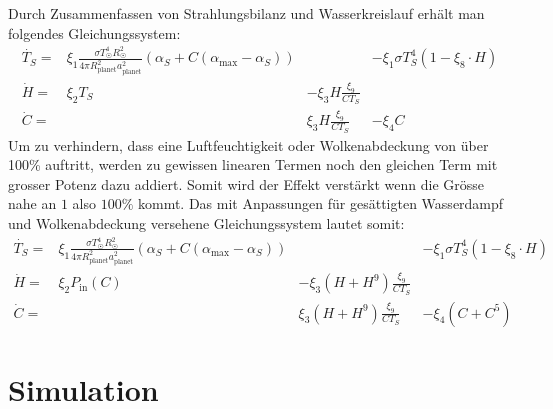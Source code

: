 \begin{refsection}
Durch Zusammenfassen von Strahlungsbilanz und Wasserkreislauf erhält man folgendes Gleichungssystem:
\begin{equation}
\begin{matrix}
\dot{T_S} = & \xi_1 \frac{\sigma T_{\astrosun}^4 R_{\astrosun}^2}{4 \pi R_{\text{planet}}^2 a_{\text{planet}}^2} (\alpha_S + C(\alpha_{\text{max}} - \alpha_S)) && - \xi_1 \sigma T_{S}^4  (1 - \xi_8 \cdot H)\\
\dot{H}   = & \xi_2 T_S              & - \xi_3 H \frac{\xi_9}{C T_S}          & \\
\dot{C}   = &                        &   \xi_3 H \frac{\xi_9}{C T_S}          & - \xi_4 C
\end{matrix}
\end{equation}
Um zu verhindern, dass eine Luftfeuchtigkeit oder Wolkenabdeckung von über 100\% auftritt, werden zu gewissen linearen Termen noch den gleichen Term mit grosser Potenz dazu addiert. Somit wird der Effekt verstärkt wenn die Grösse nahe an $1$ also $100\%$ kommt. Das mit Anpassungen für gesättigten Wasserdampf und Wolkenabdeckung versehene Gleichungssystem lautet somit:
\begin{equation}
\begin{matrix}
\dot{T_S} = & \xi_1 \frac{\sigma T_{\astrosun}^4 R_{\astrosun}^2}{4 \pi R_{\text{planet}}^2 a_{\text{planet}}^2} (\alpha_S + C(\alpha_{\text{max}} - \alpha_S)) && - \xi_1 \sigma T_{S}^4  (1 - \xi_8 \cdot H)\\
\dot{H}   = & \xi_2 P_{\text{in}}(C) & - \xi_3 (H + H^9) \frac{\xi_9}{C T_S}   &                   \\
\dot{C}   = &                        &   \xi_3 (H + H^9) \frac{\xi_9}{C T_S}   & - \xi_4 (C + C^5)
\end{matrix}
\end{equation}


\section{Simulation}


\end{refsection}
